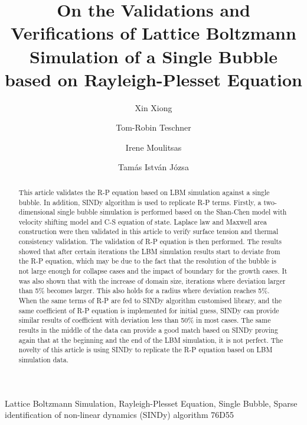 \documentclass[review]{elsarticle}
\begin{document}
\begin{frontmatter}

\title{On the Validations and Verifications of Lattice Boltzmann Simulation of a Single Bubble based on  Rayleigh-Plesset Equation}


\author[address_1]{Xin Xiong}
\author[address_1]{Tom-Robin Teschner}
\author[address_1]{Irene Moulitsas}
\author[address_1]{Tam\'{a}s Istv\'{a}n J\'{o}zsa}


\address[address_1] { Centre for Computational Engineering Sciences, Cranfield University, Cranfield MK43 0AL, UK.}

\begin{abstract}
This article validates the R-P equation based on LBM simulation against a single bubble. In addition, SINDy algorithm is used to replicate R-P terms. Firstly, a two-dimensional single bubble simulation is performed based on the Shan-Chen model with velocity shifting model and C-S equation of state. Laplace law and Maxwell area construction were then validated in this article to verify surface tension and thermal consistency validation. The validation of R-P equation is then performed. The results showed that after certain iterations the LBM simulation results start to deviate from the R-P equation, which may be due to the fact that the resolution of the bubble is not large enough for collapse cases and the impact of boundary for the growth cases. It was also shown that with the increase of domain size, iterations where deviation larger than 5\% becomes larger. This also holds for a radius where deviation reaches 5\%. When the same terms of R-P are fed to SINDy algorithm customised library, and the same coefficient of R-P equation is implemented for initial guess, SINDy can provide similar results of coefficient with deviation less than 50\% in most cases. The same results in the middle of the data can provide a good match based on SINDy proving again that at the beginning and the end of the LBM simulation, it is not perfect. The novelty of this article is using SINDy to replicate the R-P equation based on LBM simulation data.
\end{abstract}

\begin{keyword}
Lattice Boltzmann Simulation, Rayleigh-Plesset Equation, Single Bubble, Sparse identification of non-linear dynamics (SINDy) algorithm
\MSC[2010] 76D55
\end{keyword}


\end{frontmatter}
\end{document}
